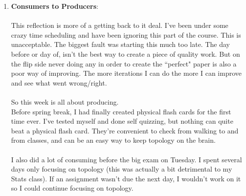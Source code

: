 \documentclass[10pt]{article}
\begin{document}
\begin{enumerate}
\item {\large {\bf Consumers to Producers}}:  \\
\\
This reflection is more of a getting back to it deal. I've been under some crazy time scheduling and have been ignoring this part of the course. This is unacceptable. The biggest fault was starting this much too late. The day before or day of, isn't the best way to create a piece of quality work. But on the flip side never doing any in order to create the ``perfect" paper is also a poor way of improving. The more iterations I can do the more I can improve and see what went wrong/right.\\
\\
So this week is all about producing.\\
Before spring break, I had finally created physical flash cards for the first time ever. I've tested myself and done self quizzing, but nothing can quite beat a physical flash card. They're convenient to check from walking to and from classes, and can be an easy way to keep topology on the brain.\\
\\
I also did a lot of consuming before the big exam on Tuesday. I spent several days only focusing on topology (this was actually a bit detrimental to my Stats class). If an assignment wasn't due the next day, I wouldn't work on it so I could continue focusing on topology.


\end{enumerate}
\end{document}
